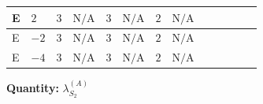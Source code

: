 \documentclass[8pt]{article}
\begin{document}
\begin{landscape}
\begin{longtable}{@{}llcccccc >{\raggedright\arraybackslash}p{0.21\linewidth} >{\raggedright\arraybackslash}p{0.21\linewidth} >{\raggedright\arraybackslash}p{0.21\linewidth}@{}}
\midrule
E & $2$ & $3$ & $\text{N/A}$ & $3$ & $\text{N/A}$ & $2$ & $\text{N/A}$ & \scriptsize\adjustbox{max width=\linewidth}{$\begin{gathered} +3 {\lambda_{HS_2}^{(A)}}^2\end{gathered}$} & \scriptsize\adjustbox{max width=\linewidth}{$\begin{gathered} +12 {\lambda_{S_2}^{(1)}} {\lambda_{S_2}^{(A)}}\end{gathered}$} & \scriptsize\adjustbox{max width=\linewidth}{$\begin{gathered} +20 {\lambda_{S_2}^{(A)}}^2\end{gathered}$} \\
\midrule
E & $-2$ & $3$ & $\text{N/A}$ & $3$ & $\text{N/A}$ & $2$ & $\text{N/A}$ & \scriptsize\adjustbox{max width=\linewidth}{$\begin{gathered} +3 {\lambda_{HS_2}^{(A)}}^2\end{gathered}$} & \scriptsize\adjustbox{max width=\linewidth}{$\begin{gathered} +12 {\lambda_{S_2}^{(1)}} {\lambda_{S_2}^{(A)}}\end{gathered}$} & \scriptsize\adjustbox{max width=\linewidth}{$\begin{gathered} +20 {\lambda_{S_2}^{(A)}}^2\end{gathered}$} \\
\midrule
E & $-4$ & $3$ & $\text{N/A}$ & $3$ & $\text{N/A}$ & $2$ & $\text{N/A}$ & \scriptsize\adjustbox{max width=\linewidth}{$\begin{gathered} +3 {\lambda_{HS_2}^{(A)}}^2\end{gathered}$} & \scriptsize\adjustbox{max width=\linewidth}{$\begin{gathered} +12 {\lambda_{S_2}^{(1)}} {\lambda_{S_2}^{(A)}}\end{gathered}$} & \scriptsize\adjustbox{max width=\linewidth}{$\begin{gathered} +20 {\lambda_{S_2}^{(A)}}^2\end{gathered}$} \\
\midrule
\bottomrule
\end{longtable}
\clearpage
\noindent\textbf{Quantity: }$\lambda_{S_2}^{(A)}$\par\smallskip

\end{landscape}
\end{document}
